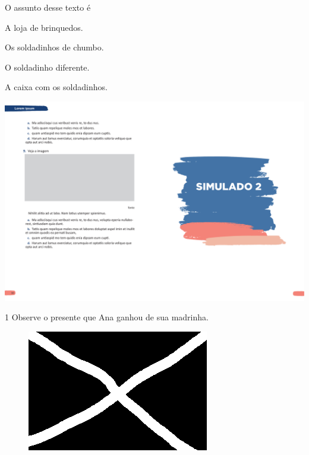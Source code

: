 O assunto desse texto é

\begin{escolha}
\item A loja de brinquedos.

\item Os soldadinhos de chumbo.

\item O soldadinho diferente.

\item A caixa com os soldadinhos.
\end{escolha}


\vspace*{-3.4cm}
\hspace*{-3.7cm}\includegraphics[scale=1]{../watermarks/2simulado5ano.pdf}

\num{1} Observe o presente que Ana ganhou de sua madrinha.

\begin{figure}[htpb!]
\centering
\includegraphics[width=.5\textwidth]{media/confederados.png}
\end{figure}

